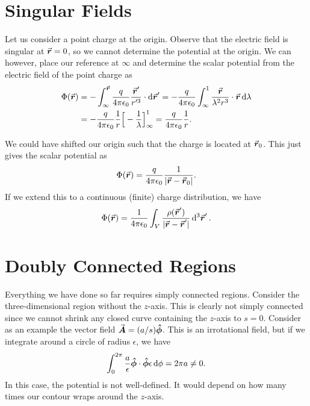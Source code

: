 \section{Singular Fields}

Let us consider a point charge at the origin.
Observe that the electric field is singular at $\va*{r} = 0$, so we cannot determine the potential at the origin.
We can however, place our reference at $\infty$ and determine the scalar potential from the electric field of the point charge as
\begin{align}
    \Phi(\va*{r}) &= - \int_{\infty}^{\va*{r}} \frac{q}{4 \pi \epsilon_0} \frac{\va*{r}'}{r'^3} \cdot \dd{\va*{r}'} = - \frac{q}{4 \pi \epsilon_0} \int_{\infty}^{1} \frac{\va*{r}}{\lambda^2 r^3} \cdot \va*{r} \dd{\lambda} \nonumber \\
                  &= -\frac{q}{4 \pi \epsilon_0} \frac{1}{r} \Big[ -\frac{1}{\lambda} \Big]_{\infty}^{1} = \frac{q}{4 \pi \epsilon_0} \frac{1}{r}
.\end{align}

We could have shifted our origin such that the charge is located at $\va*{r}_{0}$.
This just gives the scalar potential as
\begin{eqnarray}
    \Phi(\va*{r}) = \frac{q}{4 \pi \epsilon_0} \frac{1}{|\va*{r} - \va*{r}_{0}|}
.\end{eqnarray}
If we extend this to a continuous (finite) charge distribution, we have
\begin{eqnarray}
    \Phi(\va*{r}) = \frac{1}{4 \pi \epsilon_0} \int_{V} \frac{\rho(\va*{r}')}{|\va*{r} - \va*{r}'|} \dd[3]{\va*{r}'}
.\end{eqnarray}

\section{Doubly Connected Regions}

Everything we have done so far requires simply connected regions.
Consider the three-dimensional region without the $z$-axis.
This is clearly not simply connected since we cannot shrink any closed curve containing the $z$-axis to $s = 0$.
Consider as an example the vector field $\va*{A} = (a/s) \vu*{\phi}$.
This is an irrotational field, but if we integrate around a circle of radius $\epsilon$, we have
\begin{eqnarray}
    \int_{0}^{2\pi} \frac{a}{\epsilon} \vu*{\phi} \cdot \vu*{\phi} \epsilon \dd{\phi} = 2 \pi a \ne 0
.\end{eqnarray}
In this case, the potential is not well-defined.
It would depend on how many times our contour wraps around the $z$-axis.





